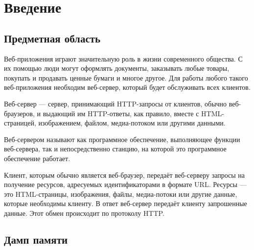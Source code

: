 \documentclass[20pt]{article}
\begin{document}
\newpage

\tableofcontents

\newpage

\section{Введение}

\subsection{Предметная область}

Веб-приложения играют значительную роль в жизни современного общества. С их
помощью люди могут оформлять документы, заказывать любые товары, покупать и
продавать ценные бумаги и многое другое. Для работы любого такого веб-приложения
необходим веб-сервер, который будет обслуживать всех клиентов.

Веб-сервер \cite{wiki/web-server} — сервер, принимающий HTTP-запросы от клиентов,
обычно веб-браузеров, и выдающий им HTTP-ответы, как правило, вместе с
HTML-страницей, изображением, файлом, медиа-потоком или другими данными.

Веб-сервером называют как программное обеспечение, выполняющее функции веб-сервера,
так и непосредственно станцию, на которой это программное обеспечение работает.

Клиент, которым обычно является веб-браузер, передаёт веб-серверу запросы на
получение ресурсов, адресуемых идентификаторами в формате URL. Ресурсы — это
HTML-страницы, изображения, файлы, медиа-потоки или другие данные, которые
необходимы клиенту. В ответ веб-сервер передаёт клиенту запрошенные данные.
Этот обмен происходит по протоколу HTTP.

\subsection{Дамп памяти}
\end{document}
